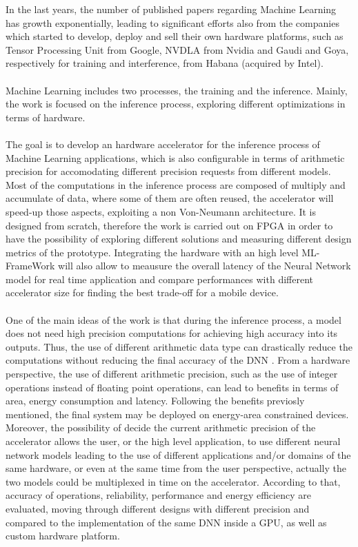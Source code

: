 In the last years, the number of published papers regarding Machine Learning has growth exponentially, leading to significant efforts also from the companies which started to develop, deploy and sell their own hardware platforms, such as Tensor Processing Unit \cite{paper:40} from Google, NVDLA\cite{WEBSITE:6} from Nvidia and Gaudi \cite{paper:39} and Goya\cite{paper:38}, respectively for training and interference, from Habana (acquired by Intel).\\\\
Machine Learning includes two processes, the training and the inference. Mainly, the work is focused on the inference process, exploring different optimizations in terms of hardware.\\\\The goal is to develop an hardware accelerator for the inference process of Machine Learning applications, which is also configurable in terms of arithmetic precision for accomodating different precision requests from different models. Most of the computations in the inference process are composed of multiply and accumulate of data, where some of them are often reused, the accelerator will speed-up those aspects, exploiting a non Von-Neumann architecture. It is designed from scratch, therefore the work is carried out on FPGA in order to have the possibility of exploring different solutions and measuring different design metrics of the prototype. Integrating the hardware with an high level ML-FrameWork will also allow to meausure the overall latency of the Neural Network model for real time application and compare performances with different accelerator size for finding the best trade-off for a mobile device.\\\\
One of the main ideas of the work is that during the inference process, a model does not need high precision computations \cite{paper:8} \cite{paper:15}for achieving high accuracy into its outputs. Thus, the use of different arithmetic data type can drastically reduce the computations without reducing the final accuracy of the DNN \cite{paper:7} \cite{paper:8}. From a hardware perspective,  the use of different arithmetic precision\cite{paper:14}, such as the use of integer operations instead of floating point operations, can lead to benefits in terms of area, energy consumption and latency. Following the benefits previosly mentioned, the final system may be deployed on energy-area constrained devices. Moreover, the possibility of decide the current arithmetic precision of the accelerator allows the user, or the high level application, to use different neural network models leading to the use of different  applications and/or domains of the same hardware, or even at the same time from the user perspective, actually the two models could be multiplexed in time on the accelerator.\newline
According to that, accuracy of operations, reliability, performance and energy efficiency are evaluated, moving through different designs with different precision and compared to the implementation of the same DNN inside a GPU, as well as custom hardware platform.


